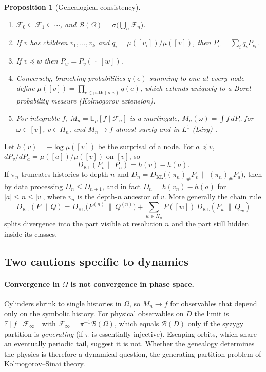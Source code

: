 \documentclass[11pt]{article}
\newtheorem{proposition}{Proposition}
\theoremstyle{remark}
\newcommand{\B}{\mathcal{B}}
\newcommand{\F}{\mathcal{F}}
\newcommand{\E}{\mathbb{E}}
\newcommand{\KL}{D_{\mathrm{KL}}}
\begin{document}
\begin{proposition}[Genealogical consistency]\label{prop:consistency}
\begin{enumerate}[label=(\roman*)]
\item $\F_0\subseteq\F_1\subseteq\cdots$, and $\B(\Omega)=\sigma\bigl(\bigcup_n\F_n\bigr)$.
\item If $v$ has children $v_1,\dots,v_k$ and $q_i=\mu([v_i])/\mu([v])$, then $P_v=\sum_iq_iP_{v_i}$.
\item If $v\preceq w$ then $P_w=P_v(\,\cdot\mid[w])$.
\item Conversely, branching probabilities $q(e)$ summing to one at every node define
      $\mu([v])=\prod_{e\in\mathrm{path}(o,v)}q(e)$, which extends uniquely to a Borel probability measure
      (Kolmogorov extension).
\item For integrable $f$, $M_n=\E_\mu[f\mid\F_n]$ is a martingale, $M_n(\omega)=\int f\,dP_{v}$ for
      $\omega\in[v]$, $v\in H_n$, and $M_n\to f$ almost surely and in $L^1$ (L\'evy) \cite{Williams1991}.
\end{enumerate}
\end{proposition}

\noindent Let $h(v)=-\log\mu([v])$ be the surprisal of a node. For $a\preceq v$, $dP_v/dP_a=\mu([a])/\mu([v])$
on $[v]$, so
\begin{equation}
  \KL(P_v\,\|\,P_a)=h(v)-h(a).
\end{equation}
If $\pi_n$ truncates histories to depth $n$ and $D_n=\KL\bigl((\pi_n)_\#P_v\,\|\,(\pi_n)_\#P_a\bigr)$, then by
data processing $D_n\le D_{n+1}$, and in fact $D_n=h(v_n)-h(a)$ for $|a|\le n\le|v|$, where $v_n$ is the
depth-$n$ ancestor of $v$. More generally the chain rule
\begin{equation}
  \KL(P\,\|\,Q)=\KL\bigl(P^{(n)}\,\|\,Q^{(n)}\bigr)+\sum_{w\in H_n}P([w])\,\KL(P_w\,\|\,Q_w)
\end{equation}
splits divergence into the part visible at resolution $n$ and the part still hidden inside its classes.

\subsection{Two cautions specific to dynamics}

\paragraph{Convergence in $\Omega$ is not convergence in phase space.} Cylinders shrink to single histories in
$\Omega$, so $M_n\to f$ for observables that depend only on the symbolic history. For physical observables on
$D$ the limit is $\E[f\mid\F_\infty]$ with $\F_\infty=\pi^{-1}\B(\Omega)$, which equals $\B(D)$ only if the
syzygy partition is \emph{generating} (if $\pi$ is essentially injective). Escaping orbits, which share an
eventually periodic tail, suggest it is not. Whether the genealogy determines the physics is therefore a
dynamical question, the generating-partition problem of Kolmogorov--Sinai theory.
\end{document}
